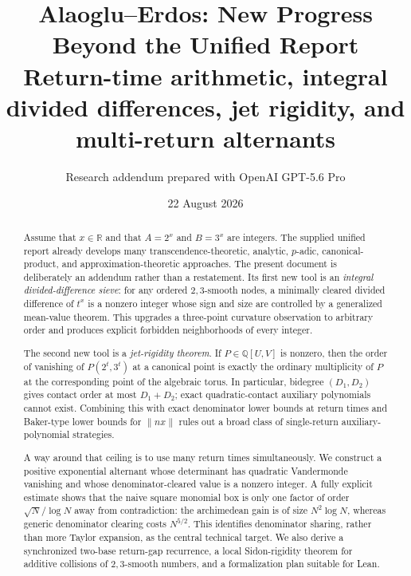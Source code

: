 \documentclass[11pt]{article}
\title{\textbf{Alaoglu--Erdos: New Progress Beyond the Unified Report}\\[3pt]
\large Return-time arithmetic, integral divided differences, jet rigidity, and multi-return alternants}
\author{Research addendum prepared with OpenAI GPT-5.6 Pro}
\date{22 August 2026}
\theoremstyle{definition}
\theoremstyle{remark}
\newcommand{\QQ}{\mathbb Q}
\newcommand{\RR}{\mathbb R}
\begin{document}
\maketitle

\begin{center}
\end{center}

\begin{abstract}
Assume that $x\in\RR$ and that $A=2^x$ and $B=3^x$ are integers. The supplied unified report already develops many transcendence-theoretic, analytic, $p$-adic, canonical-product, and approximation-theoretic approaches. The present document is deliberately an addendum rather than a restatement. Its first new tool is an \emph{integral divided-difference sieve}: for any ordered $2,3$-smooth nodes, a minimally cleared divided difference of $t^x$ is a nonzero integer whose sign and size are controlled by a generalized mean-value theorem. This upgrades a three-point curvature observation to arbitrary order and produces explicit forbidden neighborhoods of every integer.

The second new tool is a \emph{jet-rigidity theorem}. If $P\in\QQ[U,V]$ is nonzero, then the order of vanishing of $P(2^t,3^t)$ at a canonical point is exactly the ordinary multiplicity of $P$ at the corresponding point of the algebraic torus. In particular, bidegree $(D_1,D_2)$ gives contact order at most $D_1+D_2$; exact quadratic-contact auxiliary polynomials cannot exist. Combining this with exact denominator lower bounds at return times and Baker-type lower bounds for $\|nx\|$ rules out a broad class of single-return auxiliary-polynomial strategies.

A way around that ceiling is to use many return times simultaneously. We construct a positive exponential alternant whose determinant has quadratic Vandermonde vanishing and whose denominator-cleared value is a nonzero integer. A fully explicit estimate shows that the naive square monomial box is only one factor of order $\sqrt N/\log N$ away from contradiction: the archimedean gain is of size $N^2\log N$, whereas generic denominator clearing costs $N^{5/2}$. This identifies denominator sharing, rather than more Taylor expansion, as the central technical target. We also derive a synchronized two-base return-gap recurrence, a local Sidon-rigidity theorem for additive collisions of $2,3$-smooth numbers, and a formalization plan suitable for Lean.
\end{abstract}
\end{document}
